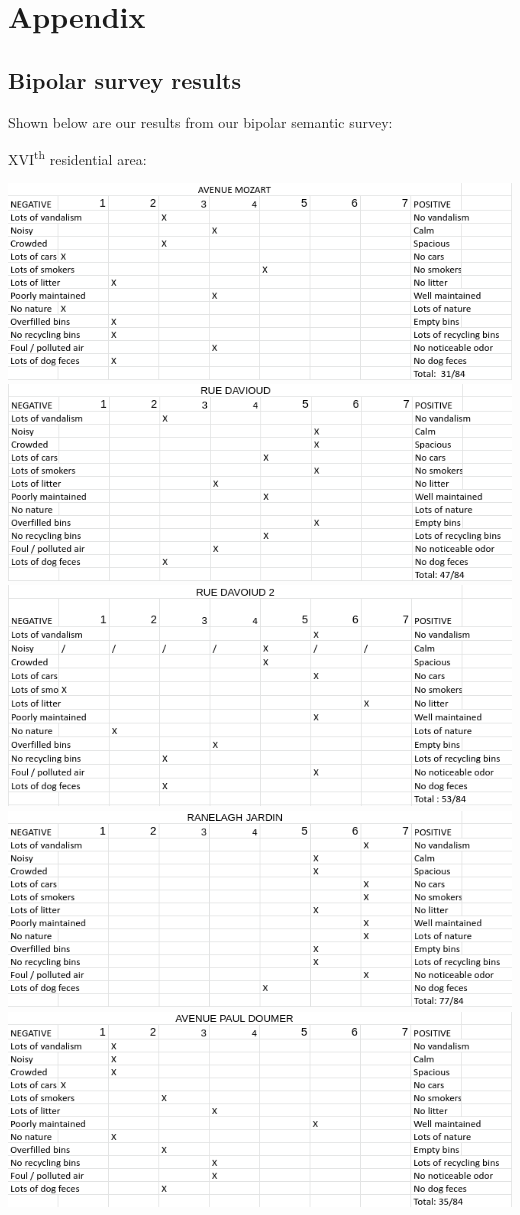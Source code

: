 \documentclass[11pt,letterpaper]{article}
\begin{document}
\printbibliography

\appendix
\section{Appendix}
\label{app}

\subsection{Bipolar survey results}
\label{app:bipolar}

Shown below are our results from our bipolar semantic survey:

XVI\textsuperscript{th} residential area:

\includegraphics[width=0.5\linewidth]{media/bipolar/mozart.png}
\includegraphics[width=0.5\linewidth]{media/bipolar/davioud1.png}
\includegraphics[width=0.5\linewidth]{media/bipolar/davioud2.png}
\includegraphics[width=0.5\linewidth]{media/bipolar/ranelagh.png}
\includegraphics[width=0.5\linewidth]{media/bipolar/pauldoumer.png}
\end{document}
